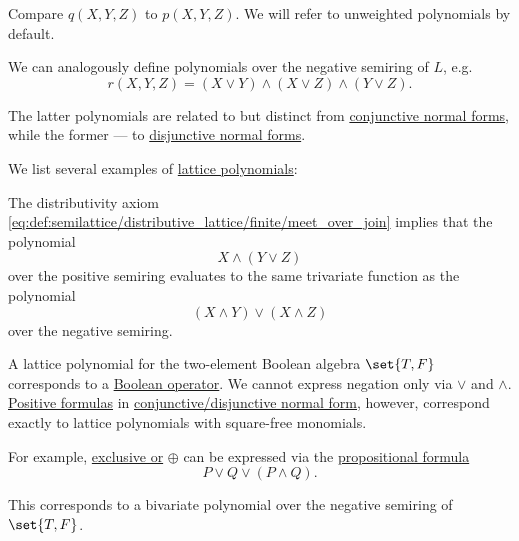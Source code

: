 \begin{remark}
  Compare \( q(X, Y, Z) \) to \( p(X, Y, Z) \). We will refer to unweighted polynomials by default.

  We can analogously define polynomials over the negative semiring of \( L \), e.g.
  \begin{equation*}
    r(X, Y, Z) = (X \vee Y) \wedge (X \vee Z) \wedge (Y \vee Z).
  \end{equation*}

  The latter polynomials are related to but distinct from \hyperref[def:cnf_and_dnf]{conjunctive normal forms}, while the former --- to \hyperref[def:cnf_and_dnf]{disjunctive normal forms}.
\end{remark}

\begin{example}\label{ex:lattice_polynomials}
  We list several examples of \hyperref[rem:lattice_polynomials]{lattice polynomials}:
  \begin{thmenum}
     The distributivity axiom \eqref{eq:def:semilattice/distributive_lattice/finite/meet_over_join} implies that the polynomial
    \begin{equation*}
      X \wedge (Y \vee Z)
    \end{equation*}
    over the positive semiring evaluates to the same trivariate function as the polynomial
    \begin{equation*}
      (X \wedge Y) \vee (X \wedge Z)
    \end{equation*}
    over the negative semiring.

     A lattice polynomial for the two-element Boolean algebra \( \set{ T, F } \) corresponds to a \hyperref[def:boolean_operator]{Boolean operator}. We cannot express negation only via \( \vee \) and \( \wedge \). \hyperref[def:positive_formula]{Positive formulas} in \hyperref[def:cnf_and_dnf]{conjunctive/disjunctive normal form}, however, correspond exactly to lattice polynomials with square-free monomials.

    For example, \hyperref[def:standard_boolean_operators]{exclusive or} \( \oplus \) can be expressed via the \hyperref[def:propositional_syntax/formula]{propositional formula}
    \begin{equation*}
      P \vee Q \vee (P \wedge Q).
    \end{equation*}

    This corresponds to a bivariate polynomial over the negative semiring of \( \set{ T, F } \).
  \end{thmenum}
\end{example}

